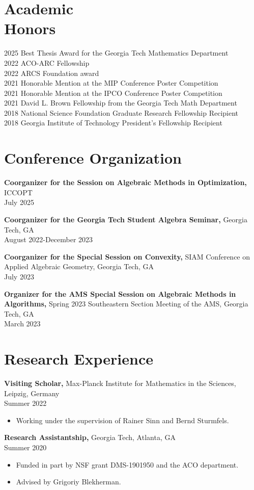 \documentclass[margin]{res}
\begin{document}
\begin{resume}
\section{Academic \\ Honors} 
2025 Best Thesis Award for the Georgia Tech Mathematics Department\\
2022 ACO-ARC Fellowship\\
2022 ARCS Foundation award\\
2021 Honorable Mention at the MIP Conference Poster Competition\\
2021 Honorable Mention at the IPCO Conference Poster Competition\\
2021 David L. Brown Fellowship from the Georgia Tech Math Department\\
2018 National Science Foundation Graduate Research Fellowship Recipient\\
2018 Georgia Institute of Technology President's Fellowship Recipient

\section{Conference Organization}
{\bf Coorganizer for the Session on Algebraic Methods in Optimization,} ICCOPT    \\       July 2025

{\bf Coorganizer for the Georgia Tech Student Algebra Seminar,} Georgia Tech, GA    \\       August 2022-December 2023

{\bf Coorganizer for the Special Session on Convexity,} SIAM Conference on Applied Algebraic Geometry, Georgia Tech, GA    \\       July 2023

{\bf Organizer for the AMS Special Session on Algebraic Methods in Algorithms,} Spring 2023 Southeastern Section Meeting of the AMS, Georgia Tech, GA    \\       March 2023

\section{Research Experience}
{\bf Visiting Scholar,} Max-Planck Institute for Mathematics in the Sciences, Leipzig, Germany \\ Summer 2022
\begin{itemize} \itemsep -2pt %
\item Working under the supervision of Rainer Sinn and Bernd Sturmfels.
\end{itemize}
{\bf Research Assistantship,} Georgia Tech, Atlanta, GA \\ Summer 2020
\begin{itemize} \itemsep -2pt %
\item Funded in part by NSF grant DMS-1901950 and the ACO department.
\item Advised by Grigoriy Blekherman.
\end{itemize}


\end{resume}
\end{document}
